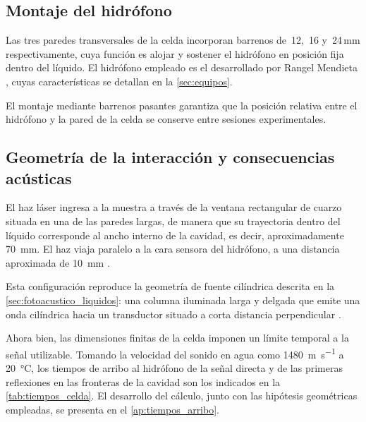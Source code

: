 \subsection*{Montaje del hidrófono}

Las tres paredes transversales de la celda incorporan barrenos de
\diameter\,12, \diameter\,16 y \diameter\,24\,\si{\milli\meter}
respectivamente, cuya función es alojar y sostener el hidrófono en
posición fija dentro del líquido. El hidrófono empleado es el
desarrollado por Rangel Mendieta \cite{Rangel2023}, cuyas
características se detallan en la \cref{sec:equipos}.

El montaje mediante barrenos pasantes garantiza que la posición
relativa entre el hidrófono y la pared de la celda se conserve entre
sesiones experimentales.

\subsection*{Geometría de la interacción y consecuencias acústicas}

El haz láser ingresa a la muestra a través de la ventana rectangular
de cuarzo situada en una de las paredes largas, de manera que su
trayectoria dentro del líquido corresponde al ancho interno de la
cavidad, es decir, aproximadamente \SI{70}{\milli\meter}. El haz
viaja paralelo a la cara sensora del hidrófono, a una distancia
aproximada de \SI{10}{\milli\meter} \cite{Rangel2023}.

Esta configuración reproduce la geometría de fuente cilíndrica
descrita en la \cref{sec:fotoacustico_liquidos}: una columna
iluminada larga y delgada que emite una onda cilíndrica hacia un
transductor situado a corta distancia perpendicular
\cite{PatelTam1981}.

Ahora bien, las dimensiones finitas de la celda imponen un límite
temporal a la señal utilizable. Tomando la velocidad del sonido en
agua como \SI{1480}{\meter\per\second} a \SI{20}{\celsius}, los
tiempos de arribo al hidrófono de la señal directa y de las primeras
reflexiones en las fronteras de la cavidad son los indicados en la
\cref{tab:tiempos_celda}. El desarrollo del cálculo, junto con las
hipótesis geométricas empleadas, se presenta en el
\cref{ap:tiempos_arribo}.

